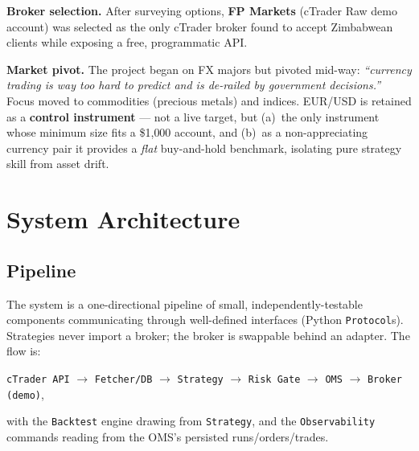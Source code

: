 \documentclass[11pt,a4paper]{article}
\newcommand{\tbot}[1]{\texttt{#1}}
\begin{document}
\noindent\textbf{Broker selection.} After surveying options, \textbf{FP Markets} (cTrader Raw demo account) was selected as the only cTrader broker found to accept Zimbabwean clients while exposing a free, programmatic API.

\noindent\textbf{Market pivot.} The project began on FX majors but pivoted mid-way: \emph{``currency trading is way too hard to predict and is de-railed by government decisions.''} Focus moved to commodities (precious metals) and indices. EUR/USD is retained as a \textbf{control instrument} --- not a live target, but (a)~the only instrument whose minimum size fits a \$1{,}000 account, and (b)~as a non-appreciating currency pair it provides a \emph{flat} buy-and-hold benchmark, isolating pure strategy skill from asset drift.

\section{System Architecture}
\subsection{Pipeline}
The system is a one-directional pipeline of small, independently-testable components communicating through well-defined interfaces (Python \tbot{Protocol}s). Strategies never import a broker; the broker is swappable behind an adapter. The flow is:
\begin{center}
\tbot{cTrader API} $\to$ \tbot{Fetcher/DB} $\to$ \tbot{Strategy} $\to$ \tbot{Risk Gate} $\to$ \tbot{OMS} $\to$ \tbot{Broker (demo)},
\end{center}
with the \tbot{Backtest} engine drawing from \tbot{Strategy}, and the \tbot{Observability} commands reading from the OMS's persisted runs/orders/trades.
\end{document}
